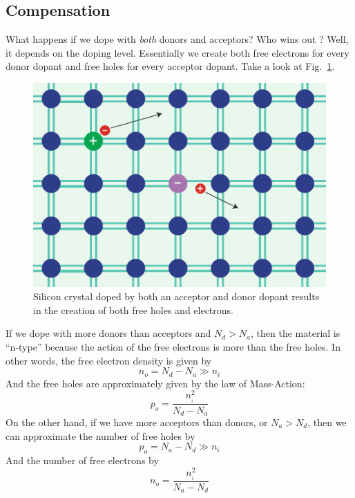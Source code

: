 \subsection{Compensation}
What happens if we dope with \textit{both} donors and acceptors?  Who wins out ?  Well, it depends on the doping level.  Essentially we create both free electrons for every donor dopant and free holes for every acceptor dopant.  Take a look at Fig.~\ref{fig:silicon_dopant_both}.
\begin{figure}[tb]
\centering
\includegraphics[width=.5\columnwidth]{silicon_dopant_both}
\caption{Silicon crystal doped by both an acceptor and donor dopant results in the creation of both free holes and electrons.}
\label{fig:silicon_dopant_both}
\end{figure}
If we dope with more donors than acceptors and $N_d > N_a$, then the material is “n-type” because the action of the free electrons is more than the free holes.  In other words, the free electron density is given by
    \begin{equation}
        {n_o} = {N_d} - {N_a} \gg {n_i}
    \end{equation}
And the free holes are approximately given by the law of Mass-Action:
    \begin{equation}
        {p_o} = \frac{{n_{_i}^2}}{{{N_d} - {N_a}}}
    \end{equation}
On the other hand, if we have more acceptors than donors, or  $N_a > N_d$, then we can approximate the number of free holes by
    \begin{equation}
        {p_o} = {N_a} - {N_d} \gg {n_i}
    \end{equation}
And the number of free electrons by
    \begin{equation}
        {n_o} = \frac{{n_{_i}^2}}{{{N_a} - {N_d}}}
    \end{equation}
